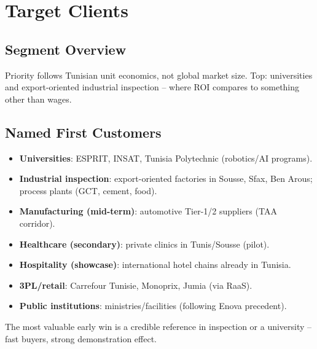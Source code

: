 \chapter{Target Clients}

\section{Segment Overview}

Priority follows Tunisian unit economics, not global market size. Top: universities and export-oriented industrial inspection -- where ROI compares to something other than wages.

\section{Named First Customers}

\begin{itemize}
    \item \textbf{Universities}: ESPRIT, INSAT, Tunisia Polytechnic (robotics/AI programs).
    \item \textbf{Industrial inspection}: export-oriented factories in Sousse, Sfax, Ben Arous; process plants (GCT, cement, food).
    \item \textbf{Manufacturing (mid-term)}: automotive Tier-1/2 suppliers (TAA corridor).
    \item \textbf{Healthcare (secondary)}: private clinics in Tunis/Sousse (pilot).
    \item \textbf{Hospitality (showcase)}: international hotel chains already in Tunisia.
    \item \textbf{3PL/retail}: Carrefour Tunisie, Monoprix, Jumia (via RaaS).
    \item \textbf{Public institutions}: ministries/facilities (following Enova precedent).
\end{itemize}

The most valuable early win is a credible reference in inspection or a university -- fast buyers, strong demonstration effect.

